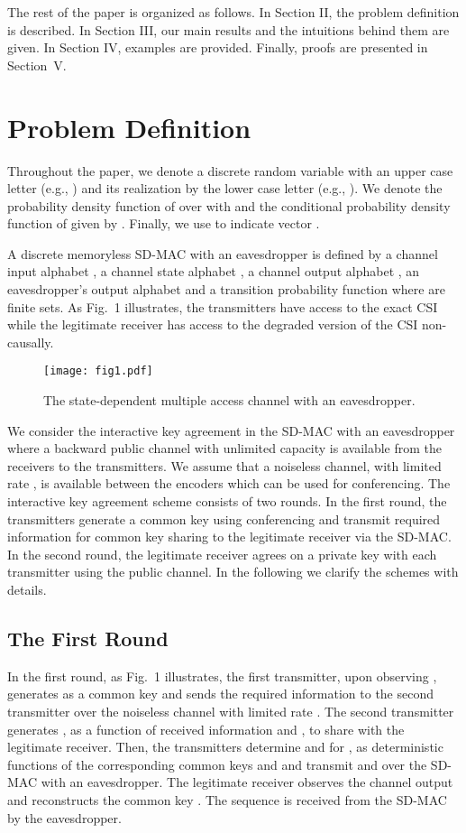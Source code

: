 \documentclass[conference,8pt]{IEEEtran}
\begin{document}
{The rest of the paper is organized as follows. In Section II, the problem definition is described. In Section III, our main results and the intuitions behind them are given. In Section IV, examples are provided. Finally, proofs are presented in Section~V. 

\section{Problem Definition}{
Throughout the paper, we denote a discrete random variable with an upper case letter (e.g., ) and its realization by the lower case letter (e.g., ). We denote the probability density function of  over  with  and the conditional probability density function of  given  by . Finally, we use  to indicate vector .

A discrete memoryless SD-MAC with an eavesdropper is defined by a channel input alphabet , a channel state alphabet , a channel output alphabet , an eavesdropper's output alphabet  and a transition probability function  where  are finite sets. As Fig.~1 illustrates, the transmitters have access to the exact CSI while the legitimate receiver has access to the degraded version of the CSI non-causally. \\

\begin{figure}
\texttt{[image: fig1.pdf]}
\caption{The state-dependent multiple access channel with an eavesdropper.}
\end{figure}

We consider the interactive key agreement in the SD-MAC with an eavesdropper where a backward public channel with unlimited capacity is available from the receivers to the transmitters. We assume that a noiseless channel, with limited rate , is available between the encoders which can be used for conferencing. The interactive key agreement scheme consists of two rounds. In the first round, the transmitters generate a common key using conferencing and transmit required information for common key sharing to the legitimate receiver via the SD-MAC. In the second round, the legitimate receiver agrees on a private key with each transmitter using the public channel. In the following we clarify the schemes with details.
\subsection{The First Round}{
In the first round, as Fig.~1 illustrates, the first transmitter, upon observing , generates  as a common key and sends the required information to the second transmitter over the noiseless channel with limited rate . The second transmitter generates , as a function of received information and , to share with the legitimate receiver. Then, the transmitters determine  and  for , as deterministic functions of the corresponding common keys and  and transmit  and  over the SD-MAC with an eavesdropper. The legitimate receiver observes the channel output  and reconstructs the common key . The sequence  is received from the SD-MAC by the eavesdropper. 

}}}
\end{document}
